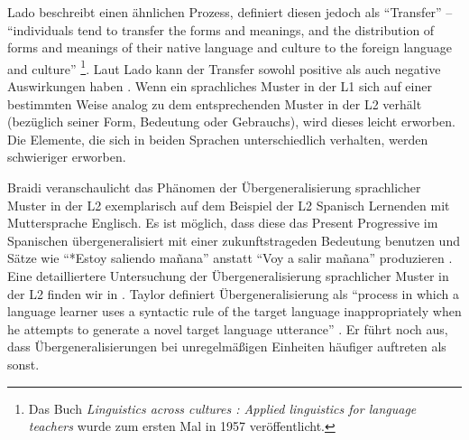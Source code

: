 Lado beschreibt einen ähnlichen Prozess, definiert diesen jedoch als ``Transfer'' --
``individuals tend to transfer the forms and meanings, and the distribution of forms and meanings of their native language and culture to the foreign language and culture'' \cite[S.2]{Lado71}
\footnote{Das Buch \textit{Linguistics across cultures : Applied linguistics
for language teachers} wurde zum ersten Mal in 1957 veröffentlicht.}.
Laut Lado kann der Transfer sowohl positive als auch negative Auswirkungen haben \cite[vgl. dazu auch][S.72]{Ellis08}.
Wenn ein sprachliches Muster in der L1 sich auf einer bestimmten Weise analog zu dem entsprechenden Muster in der L2 verhält (bezüglich seiner Form, Bedeutung oder Gebrauchs), wird dieses leicht erworben.
Die Elemente, die sich in beiden Sprachen unterschiedlich verhalten, werden schwieriger erworben.

Braidi veranschaulicht das Phänomen der Übergeneralisierung sprachlicher Muster in der L2 exemplarisch auf dem Beispiel der L2 Spanisch Lernenden mit Muttersprache Englisch.
Es ist möglich, dass diese das Present Progressive im Spanischen übergeneralisiert mit einer zukunftstrageden Bedeutung benutzen und Sätze wie ``*Estoy saliendo mañana'' anstatt ``Voy a salir mañana'' produzieren \cite[vgl.][]{Braidi99}.
Eine detailliertere Untersuchung der Übergeneralisierung sprachlicher Muster in der L2
finden wir in \cite{Taylor75}.
Taylor definiert Übergeneralisierung als ``process in which a language learner uses a syntactic rule of the
target language inappropriately when he attempts to generate a novel target language utterance'' \cite[S.74]{Taylor75}.
Er führt noch aus, dass Übergeneralisierungen bei unregelmäßigen Einheiten häufiger auftreten als sonst.




